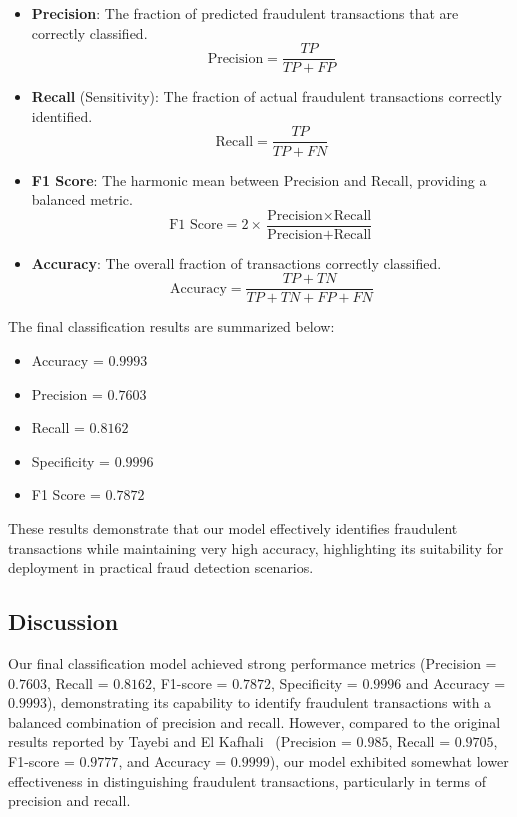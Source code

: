 \begin{itemize}
    \item \textbf{Precision}: The fraction of predicted fraudulent transactions that are correctly classified.
    \[
    \text{Precision} = \frac{TP}{TP + FP}
    \]

    \item \textbf{Recall} (Sensitivity): The fraction of actual fraudulent transactions correctly identified.
    \[
    \text{Recall} = \frac{TP}{TP + FN}
    \]

    \item \textbf{F1 Score}: The harmonic mean between Precision and Recall, providing a balanced metric.
    \[
    \text{F1 Score} = 2 \times \frac{\text{Precision} \times \text{Recall}}{\text{Precision} + \text{Recall}}
    \]

    \item \textbf{Accuracy}: The overall fraction of transactions correctly classified.
    \[
    \text{Accuracy} = \frac{TP + TN}{TP + TN + FP + FN}
    \]
\end{itemize}

The final classification results are summarized below:

\begin{itemize}
    \item Accuracy = $0.9993$
    \item Precision = $0.7603$
    \item Recall = $0.8162$
    \item Specificity = $0.9996$
    \item F1 Score = $0.7872$
\end{itemize}

These results demonstrate that our model effectively identifies fraudulent transactions while maintaining very high accuracy, highlighting its suitability for deployment in practical fraud detection scenarios.

\subsection{Discussion}
Our final classification model achieved strong performance metrics (Precision = $0.7603$, Recall = $0.8162$, F1-score = $0.7872$, Specificity = $0.9996$ and Accuracy = $0.9993$), demonstrating its capability to identify fraudulent transactions with a balanced combination of precision and recall. However, compared to the original results reported by Tayebi and El Kafhali~\cite{Tayebi2025} (Precision = $0.985$, Recall = $0.9705$, F1-score = $0.9777$, and Accuracy = $0.9999$), our model exhibited somewhat lower effectiveness in distinguishing fraudulent transactions, particularly in terms of precision and recall.

